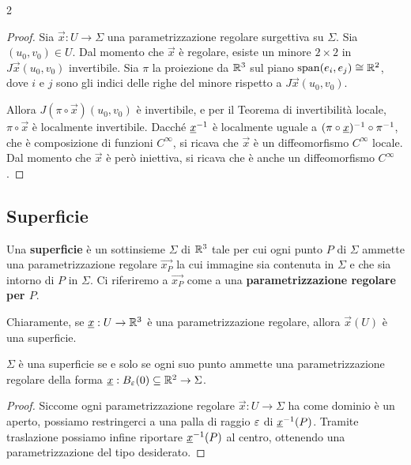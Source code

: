 \begin{multicols*}{2}
    \begin{proof}
        Sia $\vec{x} : U \to \Sigma$ una parametrizzazione regolare surgettiva su $\Sigma$. Sia $(u_0, v_0) \in U$.
        Dal momento che $\vec{x}$ è regolare, esiste un minore $2 \times 2$ in $J \vec{x}(u_0, v_0)$ invertibile.
        Sia $\pi$ la proiezione da $\mathbb{R}^3$ sul piano $\operatorname{span}(e_i, e_j) \cong \mathbb{R}^2$, dove $i$ e $j$ sono gli indici delle
        righe del minore rispetto a $J \vec{x}(u_0, v_0)$. \smallskip

        Allora $J (\pi \circ \vec{x})(u_0, v_0)$ è invertibile,
        e per il Teorema di invertibilità locale, $\pi \circ \vec{x}$ è localmente invertibile. Dacché
        ${\underline{x}}^{-1}$ è localmente uguale a $(\pi \circ {\underline{x}})^{-1} \circ \pi^{-1}$, che è composizione di
        funzioni $C^\infty$, si ricava che $\vec{x}$ è un diffeomorfismo $C^\infty$ locale. Dal momento che
        $\vec{x}$ è però iniettiva, si ricava che è anche un diffeomorfismo $C^\infty$.
    \end{proof}

    \subsection{Superficie}

    \begin{definition}[Superficie]
        Una \textbf{superficie} è un sottinsieme $\Sigma$ di $\mathbb{R}^3$ tale per cui
        ogni punto $P$ di $\Sigma$ ammette una parametrizzazione regolare $\vec{x_P}$ la cui immagine
        sia contenuta in $\Sigma$ e che sia intorno di $P$ in $\Sigma$. Ci riferiremo a
        $\vec{x_P}$ come a una \textbf{parametrizzazione regolare per $P$}.
    \end{definition}

    \begin{remark}
        Chiaramente, se ${\underline{x}} : U \to \mathbb{R}^3$ è una parametrizzazione regolare, allora $\vec{x}(U)$ è una
        superficie.
    \end{remark}

    \begin{proposition}
        $\Sigma$ è una superficie se e solo se ogni suo punto ammette una parametrizzazione
        regolare della forma ${\underline{x}} : B_\varepsilon(0) \subseteq \mathbb{R}^2 \to \Sigma$.
    \end{proposition}

    \begin{proof}
        Siccome ogni parametrizzazione regolare $\vec{x} : U \to \Sigma$ ha come dominio
        è un aperto, possiamo restringerci a una palla di raggio $\varepsilon$ di ${\underline{x}}^{-1}(P)$.
        Tramite traslazione possiamo infine riportare ${\underline{x}}^{-1}(P)$ al centro,
        ottenendo una parametrizzazione del tipo desiderato.
    \end{proof}


\end{multicols*}
